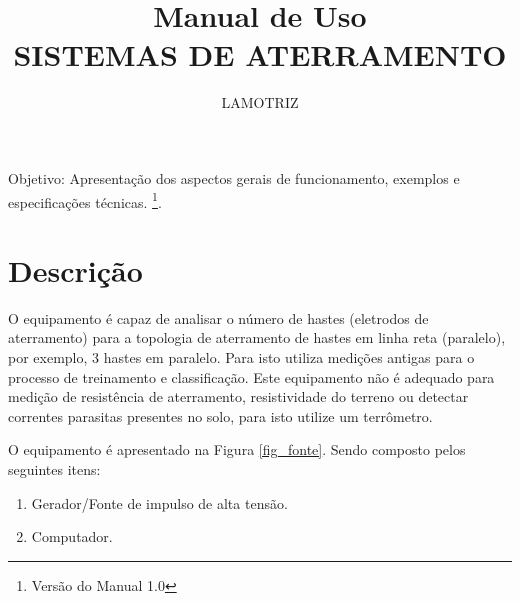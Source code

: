 \documentclass[a4paper, 10pt]{article}
\title{Manual de Uso\\SISTEMAS DE ATERRAMENTO}
\author{LAMOTRIZ}
\begin{document}
\maketitle

Objetivo: Apresentação dos aspectos gerais de funcionamento, 
exemplos e  especificações técnicas.
\footnote{Versão do Manual 1.0}.


\newpage

\tableofcontents

\newpage

\listoffigures

\newpage

\section{Descrição}

O equipamento é capaz de analisar o número de hastes
(eletrodos de aterramento) para a topologia de aterramento
de hastes em linha reta (paralelo), por exemplo, 3 hastes em paralelo. 
Para isto utiliza medições antigas para o processo de treinamento e 
classificação. Este equipamento não é adequado para medição de 
resistência de aterramento, resistividade do terreno ou detectar correntes 
parasitas presentes no solo, para isto utilize um terrômetro. 

O equipamento é apresentado na Figura \ref{fig_fonte}. Sendo composto pelos 
seguintes itens:


\begin{enumerate}
    \item Gerador/Fonte de impulso de alta tensão.
    \item Computador.
\end{enumerate}
\end{document}
